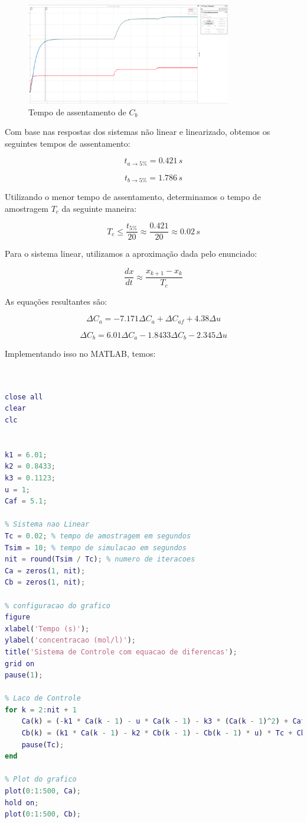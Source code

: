 \documentclass[a4paper,12pt]{report}
\begin{document}
\begin{figure}[h]
    \centering
    \includegraphics[width=0.8\textwidth]{figura11.png}
    \caption{Tempo de assentamento de \(C_b\)}
\end{figure}

Com base nas respostas dos sistemas não linear e linearizado, obtemos os seguintes tempos de assentamento:

\[
t_{a \rightarrow 5\%} = 0.421 \, s
\]

\[
t_{b \rightarrow 5\%} = 1.786 \, s
\]

Utilizando o menor tempo de assentamento, determinamos o tempo de amostragem \(T_c\) da seguinte maneira:

\[
T_c \leq \frac{t_{5\%}}{20} \approx \frac{0.421}{20} \approx 0.02 \, s
\]

Para o sistema linear, utilizamos a aproximação dada pelo enunciado:

\[
\frac{dx}{dt} \approx \frac{x_{k+1} - x_k}{T_c}
\]

As equações resultantes são:

\[
\Delta C_a = -7.171 \Delta C_a + \Delta C_{af} + 4.38 \Delta u
\]

\[
\Delta C_b = 6.01 \Delta C_a - 1.8433 \Delta C_b - 2.345 \Delta u
\]

Implementando isso no MATLAB, temos:

\begin{lstlisting}[language=Matlab, caption={Exemplo de código MATLAB}, label={lst:matlab}]


close all
clear
clc


k1 = 6.01;
k2 = 0.8433;
k3 = 0.1123;
u = 1;
Caf = 5.1;

% Sistema nao Linear
Tc = 0.02; % tempo de amostragem em segundos
Tsim = 10; % tempo de simulacao em segundos
nit = round(Tsim / Tc); % numero de iteracoes
Ca = zeros(1, nit);
Cb = zeros(1, nit);

% configuracao do grafico
figure
xlabel('Tempo (s)');
ylabel('concentracao (mol/l)');
title('Sistema de Controle com equacao de diferencas');
grid on
pause(1);

% Laco de Controle
for k = 2:nit + 1
    Ca(k) = (-k1 * Ca(k - 1) - u * Ca(k - 1) - k3 * (Ca(k - 1)^2) + Caf * u) * Tc + Ca(k - 1);
    Cb(k) = (k1 * Ca(k - 1) - k2 * Cb(k - 1) - Cb(k - 1) * u) * Tc + Cb(k - 1);
    pause(Tc);
end

% Plot do grafico
plot(0:1:500, Ca);
hold on;
plot(0:1:500, Cb);
\end{lstlisting}
\end{document}
